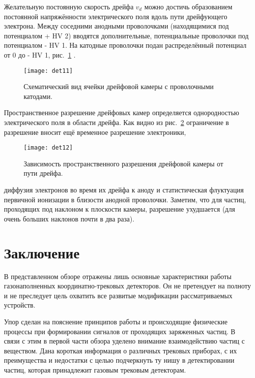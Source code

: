 Желательную постоянную скорость дрейфа $v_{d}$ можно достичь
образованием постоянной напряжённости электрического поля вдоль пути
дрейфующего электрона.
Между соседними анодными проволочками (находящимися под потенциалом
+ HV 2) вводятся дополнительные, потенциальные проволочки под
потенциалом - HV 1. На катодные проволочки подан распределённый
потенциал от 0 до - HV 1, рис.~\ref{fig:det11} \cite{sau:77}.
\begin{figure}[h]\center
  \hspace*{-0.2cm}
  \texttt{[image: det11]}
  \caption{Схематический вид ячейки дрейфовой камеры с проволочными
    катодами.}
  \label{fig:det11}
\end{figure}

Пространственное разрешение дрейфовых камер определяется однородностью
электрического поля в области дрейфа. Как видно из рис.~\ref{fig:det12}
ограничение в разрешение вносит ещё временное разрешение электроники,
\begin{figure}[h]\center
  \texttt{[image: det12]}
  \caption{Зависимость пространственного разрешения дрейфовой камеры
    от пути дрейфа.}
  \label{fig:det12}
\end{figure}
диффузия электронов во время их дрейфа к аноду и статистическая
флуктуация первичной ионизации в близости анодной проволочки. Заметим,
что для частиц, проходящих под наклоном к плоскости камеры, разрешение
ухудшается (для очень больших наклонов почти в два раза).

\clearpage
\thispagestyle{plain}
\section{Заключение}
В представленном обзоре отражены лишь основные характеристики работы
газонаполненных координатно-трековых детекторов. Он не претендует на
полноту и не преследует цель охватить все развитые модификации
рассматриваемых устройств.

Упор сделан на пояснение принципов работы и происходящие физические
процессы при формировании сигналов от проходящих заряженных частиц.
В связи с этим в первой части обзора уделено внимание взаимодействию
частиц с веществом. Дана короткая информация о различных трековых приборах,
с их преимущества и недостатки с целью подчеркнуть ту нишу в детектировании
частиц, которая принадлежит газовым трековым детекторам.

